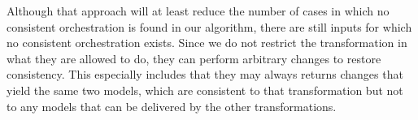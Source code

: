 Although that approach will at least reduce the number of cases in which no consistent orchestration is found in our algorithm, there are still inputs for which no consistent orchestration exists.
Since we do not restrict the transformation in what they are allowed to do, they can perform arbitrary changes to restore consistency.
This especially includes that they may always returns changes that yield the same two models, which are consistent to that transformation but not to any models that can be delivered by the other transformations.

